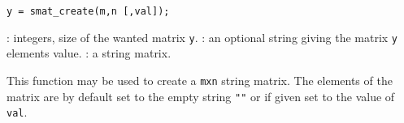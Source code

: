
\begin{mandesc}
\end{mandesc}

\begin{calling_sequence}
\begin{verbatim}
y = smat_create(m,n [,val]);
\end{verbatim}
\end{calling_sequence}
\begin{parameters}
  \begin{varlist}
    : integers, size of the wanted matrix \verb!y!.
    : an optional string giving the matrix \verb!y! elements value.
    : a string matrix.
  \end{varlist}
\end{parameters}

\begin{mandescription}
  This function may be used to create a \verb+mxn+ string matrix. 
  The elements of the matrix are by default set to the empty string \verb+""+ 
  or if given set to the value of \verb+val+.
\end{mandescription}

\begin{examples}
  \begin{program}
  \end{program}
\end{examples}

